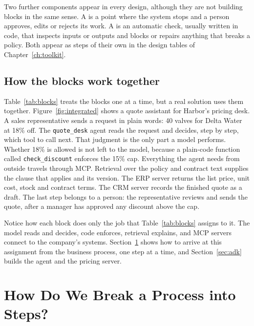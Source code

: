Two further components appear in every design, although they are not building blocks in the same sense. A  is a point where the system stops and a person approves, edits or rejects its work. A  is an automatic check, usually written in code, that inspects inputs or outputs and blocks or repairs anything that breaks a policy. Both appear as steps of their own in the design tables of Chapter~\ref{ch:toolkit}.

\subsection{How the blocks work together}
\label{sec:blocks-together}

Table~\ref{tab:blocks} treats the blocks one at a time, but a real solution uses them together. Figure~\ref{fig:integrated} shows a quote assistant for Harbor's pricing desk. A sales representative sends a request in plain words: 40 valves for Delta Water at 18\% off. The \texttt{quote\_desk} agent reads the request and decides, step by step, which tool to call next. That judgment is the only part a model performs. Whether 18\% is allowed is not left to the model, because a plain-code function called \texttt{check\_discount} enforces the 15\% cap. Everything the agent needs from outside travels through MCP. Retrieval over the policy and contract text supplies the clause that applies and its version. The ERP server returns the list price, unit cost, stock and contract terms. The CRM server records the finished quote as a draft. The last step belongs to a person: the representative reviews and sends the quote, after a manager has approved any discount above the cap.

Notice how each block does only the job that Table~\ref{tab:blocks} assigns to it. The model reads and decides, code enforces, retrieval explains, and MCP servers connect to the company's systems. Section~\ref{sec:decompose} shows how to arrive at this assignment from the business process, one step at a time, and Section~\ref{sec:adk} builds the agent and the pricing server.



\section{How Do We Break a Process into Steps?}
\label{sec:decompose}

